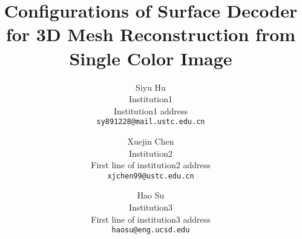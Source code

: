 \documentclass[10pt,twocolumn,letterpaper]{article}
\begin{document}
\title{Configurations of Surface Decoder for 3D Mesh Reconstruction from Single Color Image}

\author{Siyu Hu\\
Institution1\\
Institution1 address\\
{\tt\small sy891228@mail.ustc.edu.cn}
\and
Xuejin Chen\\
Institution2\\
First line of institution2 address\\
{\tt\small xjchen99@ustc.edu.cn}
\and 
Hao Su\\
Institution3\\
First line of institution3 address\\
{\tt\small haosu@eng.ucsd.edu}
}

\maketitle
 





{\small


}

\end{document}
